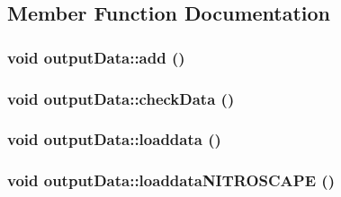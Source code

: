 \subsection{Member Function Documentation}
\hypertarget{classoutput_data_a63e0c533fd9ff48a970f8207ed3047cb}{
\subsubsection[{add}]{\setlength{\rightskip}{0pt plus 5cm}void outputData::add ()}}
\label{classoutput_data_a63e0c533fd9ff48a970f8207ed3047cb}
\hypertarget{classoutput_data_a0826d605088812ac5f4bba01ea601117}{
\subsubsection[{checkData}]{\setlength{\rightskip}{0pt plus 5cm}void outputData::checkData ()}}
\label{classoutput_data_a0826d605088812ac5f4bba01ea601117}
\hypertarget{classoutput_data_af0a91350b97125b3ef68384deb7942e3}{
\subsubsection[{loaddata}]{\setlength{\rightskip}{0pt plus 5cm}void outputData::loaddata ()}}
\label{classoutput_data_af0a91350b97125b3ef68384deb7942e3}
\hypertarget{classoutput_data_a1289c4709faed89a0b65c7c3f07970f1}{
\subsubsection[{loaddataNITROSCAPE}]{\setlength{\rightskip}{0pt plus 5cm}void outputData::loaddataNITROSCAPE ()}}
\label{classoutput_data_a1289c4709faed89a0b65c7c3f07970f1}


